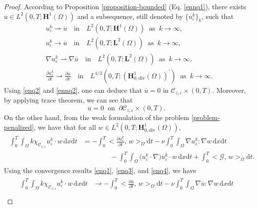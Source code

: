 \documentclass[a4paper,12pt,reqno,natbib]{amsart}
\newcommand{\dx} {\displaystyle\mathrm{d}x}
\newcommand{\dt} {\displaystyle\mathrm{d}t}
\def\H{\textbf{H}}
\def\L{\textbf{L}}
\def\div{\text{div}}
\begin{document}
\begin{proof}According to Proposition \ref{proposition-bounded} (Eq. \eqref{ennq1}), there exists $\overline{u}\in L^2(0,T;\H^1(\Omega))$ and a subsequence, still denoted by $\{u_\varepsilon^k\}_{k}$, such that
\begin{align}
  \label{enq1}  &u_\varepsilon^k\rightharpoonup \overline{u} \quad\text{in}\quad L^2(0,T;\H^1(\Omega))\;\;\text{as}\;\; k\longrightarrow\infty,\\
 \label{enq2}    &u_\varepsilon^k\longrightarrow \overline{u} \quad\text{in}\quad L^2(0,T;\L^2(\Omega))\;\;\text{as}\;\; k\longrightarrow\infty,\\
\label{enq3}      &\nabla u_\varepsilon^k\rightharpoonup \nabla\overline{u} \quad\text{in}\quad L^2(0,T;\L^2(\Omega))\;\;\text{as}\;\; k\longrightarrow\infty,\\
   \label{enq4}    &\frac{\partial u_\varepsilon^k}{\partial t}\rightharpoonup \frac{\partial \overline{u}}{\partial t} \quad\text{in}\quad L^{4/3}(0,T;(\H^1_{0,\text{div}}(\Omega))^\prime)\;\;\text{as}\;\; k\longrightarrow\infty.
\end{align}
Using \eqref{enq2} and \eqref{ennq2}, one can deduce that $\overline{u}=0$ in $\mathcal{C}_{z,\varepsilon}\times(0,T).$ Moreover, by applying trace theorem, we can see that
\begin{equation}
\overline{u}=0\;\;\text{on}\;\;\partial\mathcal{C}_{z,\varepsilon}\times(0,T).
\end{equation}
On the other hand, from the weak formulation of the problem \eqref{problem-penalized}, we have that for all $w\in L^2(0,T;\H^1_{0,\div}(\Omega)),$
\begin{align}
\begin{split}\label{FVuk}
    \int_0^T\int_\Omega k\chi_{\mathcal{C}_{z,\varepsilon}}u_\varepsilon^k\cdot w \,\dx\dt&=-\int_0^T\big<\frac{\partial u_\varepsilon^k}{\partial t},\,w \big>_\Omega\dt-\nu\int_0^T\int_\Omega\nabla u_\varepsilon^k:\nabla w \,\dx\dt\\
    &\qquad\qquad-\int_0^T\int_\Omega\big(u_\varepsilon^k\cdot\nabla\big) u_\varepsilon^k\cdot w \,\dx\dt +\int_0^T\big<\mathcal{G},\,w \big>_\Omega\dt.
    \end{split}
\end{align}
Using the convergence results \eqref{enq1}, \eqref{enq3}, and \eqref{enq4}, we have
\begin{align}
\begin{split}
      \int_0^T\int_\Omega k\chi_{\mathcal{C}_{z,\varepsilon}}u_\varepsilon^k\cdot w \,\dx\dt&\longrightarrow-\int_0^T\big<\frac{\partial \overline{u}}{\partial t},\,w \big>_\Omega\dt-\nu\int_0^T\int_\Omega\nabla \overline{u}:\nabla w \,\dx\dt\\

\end{split}
\end{align}
\end{proof}
\end{document}
